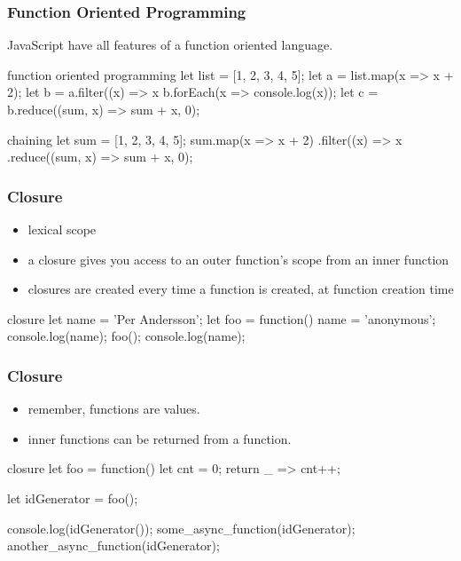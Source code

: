\begin{frame}[fragile] \frametitle{Function Oriented Programming}

JavaScript have all features of a function oriented language.

\begin{CodeBox}{function oriented programming}
let list = [1, 2, 3, 4, 5];
let a = list.map(x => x + 2);
let b = a.filter((x) => x %
b.forEach(x => console.log(x));
let c = b.reduce((sum, x) => sum + x, 0);
\end{CodeBox}
\begin{CodeBox}{chaining}
let sum = [1, 2, 3, 4, 5];
sum.map(x => x + 2)
.filter((x) => x %
.reduce((sum, x) => sum + x, 0);
\end{CodeBox}
\end{frame}

\begin{frame}[fragile] \frametitle{Closure}

\begin{itemize}
  \item lexical scope
  \item a closure gives you access to an outer function’s scope from an inner function
  \item closures are created every time a function is created, at function creation time
\end{itemize}
\vspace{5mm}

\begin{CodeBox}{closure}
let name = 'Per Andersson';
let foo = function() {
  name = 'anonymous';
}
console.log(name);
foo();
console.log(name);
\end{CodeBox}
\end{frame}

\begin{frame}[fragile] \frametitle{Closure}

\begin{itemize}
  \item remember, functions are values.
  \item inner functions can be returned from a function.
\end{itemize}

\vspace{4mm}

\begin{CodeBox}{closure}
let foo = function() {
  let cnt = 0;
  return _ => cnt++;
}

let idGenerator = foo();

console.log(idGenerator());
some_async_function(idGenerator);
another_async_function(idGenerator);
\end{CodeBox}
\end{frame}

